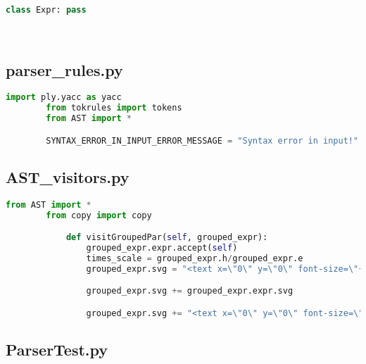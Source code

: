     \begin{lstlisting}[language=Python]
        class Expr: pass




    \end{lstlisting}

\subsection{parser\_rules.py}

    \begin{lstlisting}[language=Python]
        import ply.yacc as yacc
        from tokrules import tokens
        from AST import *

        SYNTAX_ERROR_IN_INPUT_ERROR_MESSAGE = "Syntax error in input!"


    \end{lstlisting}


\subsection{AST\_visitors.py}

    \begin{lstlisting}[language=Python]
        from AST import *
        from copy import copy

            def visitGroupedPar(self, grouped_expr):
                grouped_expr.expr.accept(self)
                times_scale = grouped_expr.h/grouped_expr.e
                grouped_expr.svg = "<text x=\"0\" y=\"0\" font-size=\"{}\" transform=\"translate({},{}) scale(1,{})\">(</text> \n".format(grouped_expr.e, grouped_expr.x, grouped_expr.y-(times_scale-1)*0.2*grouped_expr.e, times_scale)

                grouped_expr.svg += grouped_expr.expr.svg

                grouped_expr.svg += "<text x=\"0\" y=\"0\" font-size=\"{}\" transform=\"translate({},{}) scale(1,{})\">)</text> \n".format(grouped_expr.e, grouped_expr.x + grouped_expr.a - 0.6*grouped_expr.e, grouped_expr.y-(times_scale-1)*0.2*grouped_expr.e, times_scale)

    \end{lstlisting}


\subsection{ParserTest.py}


